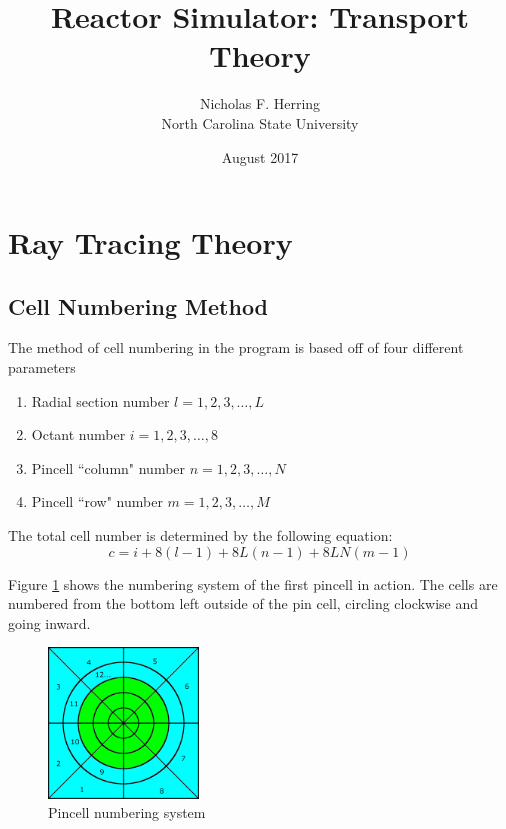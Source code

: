 \documentclass{article}
\begin{document}
\title{Reactor Simulator: Transport Theory}

\author{Nicholas F. Herring\\
North Carolina State University}

\date{August 2017}

\maketitle

\section{Ray Tracing Theory}
\subsection{Cell Numbering Method}

The method of cell numbering in the program is based off of four different parameters

\begin{enumerate}
\item Radial section number $l=1, 2, 3, \dots, L$
\item Octant number $i=1, 2, 3, \dots, 8$
\item Pincell ``column" number $n=1, 2, 3, \dots, N$
\item Pincell ``row" number $m=1, 2, 3, \dots, M$
\end{enumerate}

The total cell number is determined by the following equation:
\begin{equation}
 c=i+8(l-1)+8 L(n-1)+8 LN(m-1)
 \label{eq:cellnumber}
\end{equation}

Figure \ref{fig:pincell} shows the numbering system of the first pincell in action. The cells are numbered from the bottom left outside of the pin cell, circling clockwise and going inward.

\begin{figure}[h]
\begin{center}
\includegraphics[width=40mm]{pincell.png}
\caption{Pincell numbering system}
\end{center}
\label{fig:pincell}
\end{figure}
\end{document}
